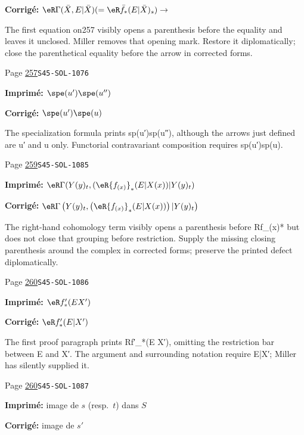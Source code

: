 \begin{description}
\par\noindent\textbf{Corrigé:} \(\eR\Gamma(\bar X,E|\bar X) (=\eR\bar f_\ast (E|\bar X)_s) \to\)
\par\noindent The first equation on257 visibly opens a parenthesis before the equality and leaves it unclosed. Miller removes that opening mark. Restore it diplomatically; close the parenthetical equality before the arrow in corrected forms.
\smallskip
\item[\hypertarget{apparatus:FR-0267}{267}] Page \hyperlink{printpage:fr:257}{257}\quad\texttt{S45-SOL-1076}
\par\noindent\textbf{Imprimé:} \(\spe(u')\spe(u'')\)
\par\noindent\textbf{Corrigé:} \(\spe(u')\spe(u)\)
\par\noindent The specialization formula prints sp(u′)sp(u″), although the arrows just defined are u′ and u only. Functorial contravariant composition requires sp(u′)sp(u).
\smallskip
\item[\hypertarget{apparatus:FR-0268}{268}] Page \hyperlink{printpage:fr:259}{259}\quad\texttt{S45-SOL-1085}
\par\noindent\textbf{Imprimé:} \(\eR\Gamma(Y(y)_t,(\eR {f_{(x)}}_\ast (E|X(x))|Y(y)_t)\)
\par\noindent\textbf{Corrigé:} \(\eR\Gamma\left(Y(y)_t,\left(\eR {f_{(x)}}_\ast (E|X(x))\right)|Y(y)_t\right)\)
\par\noindent The right-hand cohomology term visibly opens a parenthesis before Rf\_(x)* but does not close that grouping before restriction. Supply the missing closing parenthesis around the complex in corrected forms; preserve the printed defect diplomatically.
\smallskip
\item[\hypertarget{apparatus:FR-0269}{269}] Page \hyperlink{printpage:fr:260}{260}\quad\texttt{S45-SOL-1086}
\par\noindent\textbf{Imprimé:} \(\eR f_\ast'(E X')\)
\par\noindent\textbf{Corrigé:} \(\eR f_\ast'(E|X')\)
\par\noindent The first proof paragraph prints Rf′\_*(E X′), omitting the restriction bar between E and X′. The argument and surrounding notation require E|X′; Miller has silently supplied it.
\smallskip
\item[\hypertarget{apparatus:FR-0270}{270}] Page \hyperlink{printpage:fr:260}{260}\quad\texttt{S45-SOL-1087}
\par\noindent\textbf{Imprimé:} image de $s$ 
(resp.\ $t$) dans $S$
\par\noindent\textbf{Corrigé:} image de $s'$ 

\end{description}
